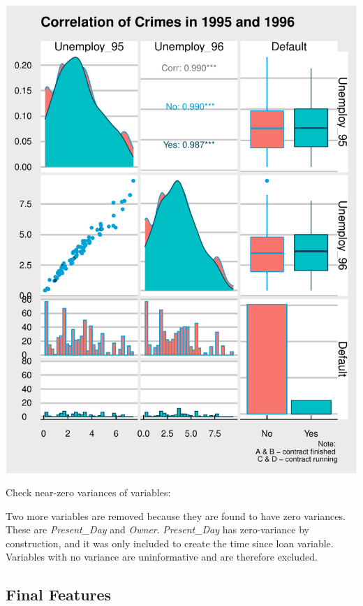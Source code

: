 \documentclass[11pt,preprint, authoryear]{elsarticle}
\let\origfigure\figure
\let\endorigfigure\endfigure
\renewenvironment{figure}[1][2] {
    \expandafter\origfigure\expandafter[H]
} {
    \endorigfigure
}
\numberwithin{equation}{section}
\numberwithin{figure}{section}
\numberwithin{table}{section}
\begin{document}
\begin{figure}[H]

{\centering \includegraphics{DS-Report-20065124_files/figure-latex/FigureCorrUnemploy-1} 

}

\caption{Correlation Between Unemployment in 1995 and 1996  \label{FigureUnemploy}}\label{fig:FigureCorrUnemploy}
\end{figure}

Check near-zero variances of variables:

Two more variables are removed because they are found to have zero
variances. These are \emph{Present\_Day} and \emph{Owner}.
\emph{Present\_Day} has zero-variance by construction, and it was only
included to create the time since loan variable. Variables with no
variance are uninformative and are therefore excluded.

\hypertarget{final-features}{%
\subsection{Final Features}\label{final-features}}
\end{document}
